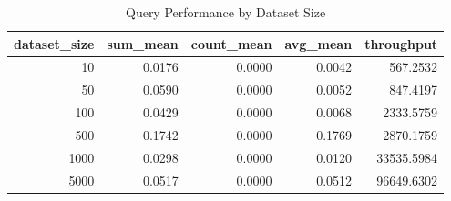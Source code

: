 \begin{table}[htbp]
\centering
\caption{Query Performance by Dataset Size}
\label{tab:query_perf}
\begin{tabular}{rrrrr}
\toprule
dataset_size & sum_mean & count_mean & avg_mean & throughput \\
\midrule
10 & 0.0176 & 0.0000 & 0.0042 & 567.2532 \\
50 & 0.0590 & 0.0000 & 0.0052 & 847.4197 \\
100 & 0.0429 & 0.0000 & 0.0068 & 2333.5759 \\
500 & 0.1742 & 0.0000 & 0.1769 & 2870.1759 \\
1000 & 0.0298 & 0.0000 & 0.0120 & 33535.5984 \\
5000 & 0.0517 & 0.0000 & 0.0512 & 96649.6302 \\
\bottomrule
\end{tabular}
\end{table}
